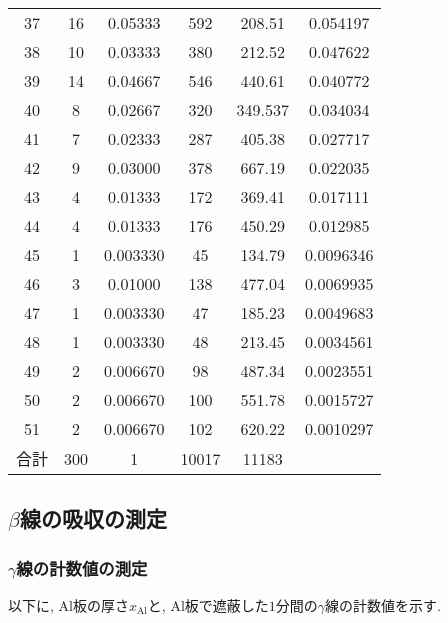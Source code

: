 \documentclass{jarticle}
\begin{document}
\begin{table}[H]
\begin{tabular}{cccccc}
    37 & 16 & 0.05333 & 592 & 208.51 & 0.054197 \\
    38 & 10 & 0.03333 & 380 & 212.52 & 0.047622 \\
    39 & 14 & 0.04667 & 546 & 440.61 & 0.040772 \\
    40 & 8 & 0.02667 & 320 & 349.537 & 0.034034 \\
    41 & 7 & 0.02333 & 287 & 405.38 & 0.027717 \\
    42 & 9 & 0.03000 & 378 & 667.19 & 0.022035 \\
    43 & 4 & 0.01333 & 172 & 369.41 & 0.017111 \\
    44 & 4 & 0.01333 & 176 & 450.29 & 0.012985 \\
    45 & 1 & 0.003330 & 45 & 134.79 & 0.0096346 \\
    46 & 3 & 0.01000 & 138 & 477.04 & 0.0069935 \\
    47 & 1 & 0.003330 & 47 & 185.23 & 0.0049683 \\
    48 & 1 & 0.003330 & 48 & 213.45 & 0.0034561 \\
    49 & 2 & 0.006670 & 98 & 487.34 & 0.0023551 \\
    50 & 2 & 0.006670 & 100 & 551.78 & 0.0015727 \\
    51 & 2 & 0.006670 & 102 & 620.22 & 0.0010297 \\
    \hline
    合計 & 300 & 1 & 10017 & 11183 & \\
    \hline
    \end{tabular}
\end{table}



\subsection{$\beta$線の吸収の測定}


\subsubsection{$\gamma$線の計数値の測定}

以下に, $\mathrm{Al}$板の厚さ$x_\mathrm{Al}$と, $\mathrm{Al}$板で遮蔽した$1$分間の$\gamma$線の計数値を示す.
\end{document}
